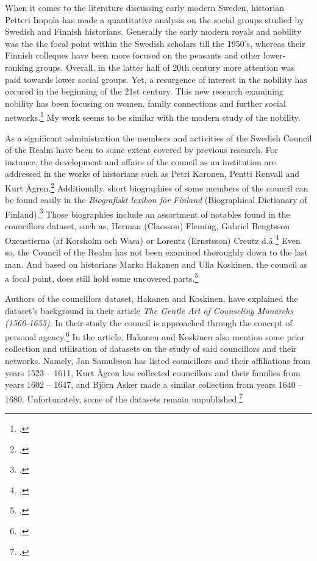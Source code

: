 When it comes to the literature discussing early modern Sweden, historian Petteri Impola has made a quantitative analysis on the social groups studied by Swedish and Finnish historians. Generally the early modern royals and nobility was the the focal point within the Swedish scholars till the 1950's, whereas their Finnish colleques have been more focused on the peasants and other lower-ranking groups. Overall, in the latter half of 20th century more attention was paid towards lower social groups. Yet, a resurgence of interest in the nobility has occured in the beginning of the 21st century. This new research examining nobility has been focusing on women, family connections and further social networks.\footcite{impola2024} My work seems to be similar with the modern study of the nobility.

As a significant administration the members and activities of the Swedish Council of the Realm have been to some extent covered by previous research. For instance, the development and affairs of the council as an institution are addressed in the works of historians such as Petri Karonen, Pentti Renvall and Kurt Ågren.\footcites{pSuurvalta}[See e. g. Pentti Renvall "\textit{Keskitetyn hallintolaitoksen kehitys}" in \textit{Suomen kulttuurihistoria. II} (1934) or Kurt Ågren "\textit{Rise and decline of an aristocracy: The Swedish social and political elite in the 17th century}" in the \textit{Scandinavian journal of history} (1976).]{hopesAndFearsCouncil} Additionally, short biographies of some members of the council can be found easily in the \textit{Biografiskt lexikon för Finland} (Biographical Dictionary of Finland).\footcite{blf} Those biographies include an assortment of notables found in the councillors dataset, such as, Herman (Claesson) Fleming, Gabriel Bengtsson Oxenstierna (af Korsholm och Wasa) or Lorentz (Ernstsson) Creutz d.ä.\footcite{blf-list} Even so, the Council of the Realm has not been examined thoroughly down to the last man. And based on historians Marko Hakanen and Ulla Koskinen, the council as a focal point, does still hold some uncovered parts.\footcite[pp. 47-48.]{HakanenAKoskinen2017} 

Authors of the councillors dataset, Hakanen and Koskinen, have explained the dataset's background in their article \textit{The Gentle Art of Counseling Monarchs (1560-1655)}. In their study the council is approached through the concept of personal agency.\footcite{HakanenAKoskinen2017} In the article, Hakanen and Koskinen also mention some prior collection and utilisation of datasets on the study of said councillors and their networks. Namely, Jan Samuleson has listed councillors and their affiliations from years 1523 – 1611, Kurt Ågren has collected councillors and their families from years 1602 – 1647, and Björn Asker made a similar collection from years 1640 – 1680. Unfortunately, some of the datasets remain unpublished.\footcite[p. 48, 67 (cite 4).]{HakanenAKoskinen2017} 

